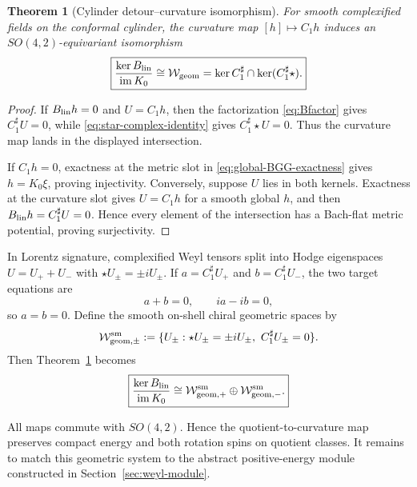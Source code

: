 \documentclass[11pt]{article}
\newtheorem{theorem}{Theorem}[section]
\theoremstyle{definition}
\theoremstyle{remark}
\newcommand{\im}{\operatorname{im}}
\begin{document}
\begin{theorem}[Cylinder detour--curvature isomorphism]
\label{thm:curvature-isomorphism}
For smooth complexified fields on the conformal cylinder, the curvature map
$[h]\mapsto C_1h$ induces an $SO(4,2)$-equivariant isomorphism
\begin{equation}\label{eq:curvature-isomorphism}
 \boxed{
 \frac{\ker B_{\rm lin}}{\im K_0}
 \cong\mathcal W_{\rm geom}
 =\ker C_1^\sharp\cap\ker(C_1^\sharp\star).}
\end{equation}
\end{theorem}

\begin{proof}
If $B_{\rm lin}h=0$ and $U=C_1h$, then the factorization
\eqref{eq:Bfactor} gives $C_1^\sharp U=0$, while
\eqref{eq:star-complex-identity} gives $C_1^\sharp\star U=0$.  Thus the
curvature map lands in the displayed intersection.

If $C_1h=0$, exactness at the metric slot in
\eqref{eq:global-BGG-exactness} gives $h=K_0\xi$, proving injectivity.
Conversely, suppose $U$ lies in both kernels.  Exactness at the curvature
slot gives $U=C_1h$ for a smooth global $h$, and then
$B_{\rm lin}h=C_1^\sharp U=0$.  Hence every element of the intersection has
a Bach-flat metric potential, proving surjectivity.
\end{proof}

In Lorentz signature, complexified Weyl tensors split into Hodge
eigenspaces $U=U_++U_-$ with $\star U_\pm=\pm iU_\pm$.  If
$a=C_1^\sharp U_+$ and $b=C_1^\sharp U_-$, the two target equations are
\begin{equation}
 a+b=0,
 \qquad ia-ib=0,
\end{equation}
so $a=b=0$.  Define the smooth on-shell chiral geometric spaces by
\begin{equation}\label{eq:smooth-Weyl-spaces}
 \mathcal W_{{\rm geom},\pm}^{\rm sm}
 :=\{U_\pm:\star U_\pm=\pm iU_\pm,
                \ C_1^\sharp U_\pm=0\}.
\end{equation}
Then Theorem~\ref{thm:curvature-isomorphism} becomes
\begin{equation}\label{eq:smooth-local-target}
 \boxed{
 \frac{\ker B_{\rm lin}}{\im K_0}
 \cong
 \mathcal W_{{\rm geom},+}^{\rm sm}
 \oplus\mathcal W_{{\rm geom},-}^{\rm sm}.}
\end{equation}

All maps commute with $SO(4,2)$.  Hence the quotient-to-curvature map
preserves compact energy and both rotation spins on quotient classes.  It
remains to match this geometric system to the abstract positive-energy
module constructed in Section~\ref{sec:weyl-module}.
\end{document}
